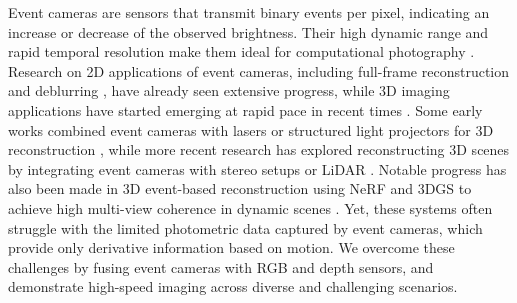 Event cameras are sensors that transmit binary events per pixel, indicating an increase or decrease of the observed brightness. 
Their high dynamic range and rapid temporal resolution make them ideal for computational photography \cite{han2020neuromorphic, tulyakov2021time, tulyakov2022time}. 
Research on 2D applications of event cameras, including full-frame reconstruction \cite{kim2008simultaneous, rebecq2016evo, scheerlinck2018continuous} and deblurring \cite{haoyu2020learning, sun2022event}, have already seen extensive progress, while 3D imaging applications have started emerging at rapid pace in recent times \cite{hidalgo2020learning,baudron2020e3d,cui2022dense,uddin2022unsupervised,wang2022evac3d,kim2016real,rebecq2018emvs,hwang2023ev,low2023robust}.
Some early works combined event cameras with lasers or structured light projectors for 3D reconstruction \cite{brandli2014adaptive, matsuda2015mc3d}, while more recent research has explored reconstructing 3D scenes by integrating event cameras with stereo setups \cite{uddin2022unsupervised} or LiDAR \cite{cui2022dense}.
Notable progress has also been made in 3D event-based reconstruction using NeRF and 3DGS to achieve high multi-view coherence in dynamic scenes \cite{rudnev2023eventnerf,klenk2023nerf,hwang2023ev,low2023robust,ma2023deformable,xiong2024event3dgs,guo2024spikegs}.
Yet, these systems often struggle with the limited photometric data captured by event cameras, which provide only derivative information based on motion.
We overcome these challenges by fusing event cameras with RGB and depth sensors, and demonstrate high-speed imaging across diverse and challenging scenarios.









